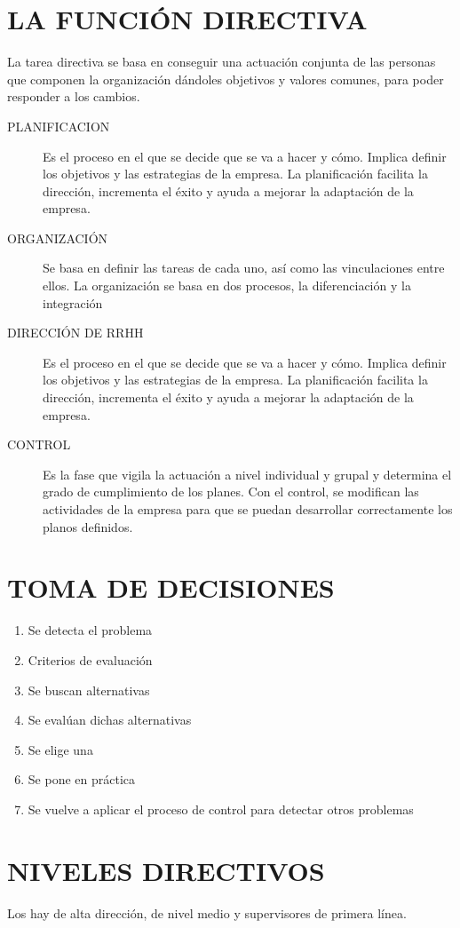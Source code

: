 \documentclass[12pt, twoside, openright]{report} %
\begin{document}
\section{LA FUNCIÓN DIRECTIVA}
La tarea directiva se basa en conseguir una actuación conjunta de las personas que componen la
organización dándoles objetivos y valores comunes, para poder responder a los cambios.
\begin{description}
	\item[PLANIFICACION] Es el proceso en el que se decide que se va a hacer y cómo. Implica definir los
	      objetivos y las estrategias de la empresa. La planificación facilita la dirección, incrementa el
	      éxito y ayuda a mejorar la adaptación de la empresa.
	\item[ORGANIZACIÓN] Se basa en definir las tareas de cada uno, así como las vinculaciones entre
	      ellos. La organización se basa en dos procesos, la diferenciación y la integración
	\item[DIRECCIÓN DE RRHH] Es el proceso en el que se decide que se va a hacer y cómo. Implica definir los
	      objetivos y las estrategias de la empresa. La planificación facilita la dirección, incrementa el
	      éxito y ayuda a mejorar la adaptación de la empresa.
	\item[CONTROL] Es la fase que vigila la actuación a nivel individual y grupal y determina el grado de
	      cumplimiento de los planes. Con el control, se modifican las actividades de la empresa para
	      que se puedan desarrollar correctamente los planos definidos.
\end{description}

\section{TOMA DE DECISIONES}
\begin{enumerate}
	\item Se detecta el problema
	\item Criterios de evaluación
	\item Se buscan alternativas
	\item Se evalúan dichas alternativas
	\item Se elige una
	\item Se pone en práctica
	\item Se vuelve a aplicar el proceso de control para detectar otros problemas
\end{enumerate}

\section{NIVELES DIRECTIVOS}
Los hay de alta dirección, de nivel medio y supervisores de primera línea.
\end{document}
